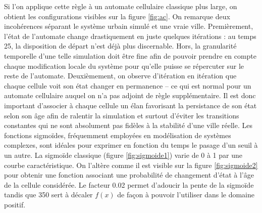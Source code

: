 \documentclass[12pt]{article}
\begin{document}
Si l'on applique cette règle à un automate cellulaire classique plus
large, on obtient les configurations visibles sur la figure
\ref{fig:ac}. On remarque deux incohérences séparant le système urbain
simulé et une vraie ville. Premièrement, l'état de l'automate change
drastiquement en juste quelques itérations : au temps 25, la
disposition de départ n'est déjà plus discernable. Hors, la
granularité temporelle d'une telle simulation doit être fine afin de
pouvoir prendre en compte chaque modification locale du système pour
qu'elle puisse se répercuter sur le reste de l'automate. Deuxièmement,
on observe d'itération en itération que chaque cellule voit son état
changer en permanence -- ce qui est normal pour un automate cellulaire
auquel on n'a pas adjoint de règle supplémentaire. Il est donc
important d'associer à chaque cellule un élan favorisant la
persistance de son état selon son âge afin de ralentir la simulation
et surtout d'éviter les transitions constantes qui ne sont absolument
pas fidèles à la stabilité d'une ville réelle. Les fonctions
sigmoïdes, fréquemment employées en modélisation de systèmes
complexes, sont idéales pour exprimer en fonction du temps le pasage
d'un seuil à un autre. La sigmoïde classique (figure
\ref{fig:sigmoide1}) varie de 0 à 1 par une courbe caractéristique. On
l'altère comme il est visible sur la figure \ref{fig:sigmoide2} pour
obtenir une fonction associant une probabilité de changement d'état à
l'âge de la cellule considérée. Le facteur 0.02 permet d'adoucir la
pente de la sigmoïde tandis que 350 sert à décaler $f(x)$ de façon à
pouvoir l'utiliser dans le domaine positif.
\end{document}
